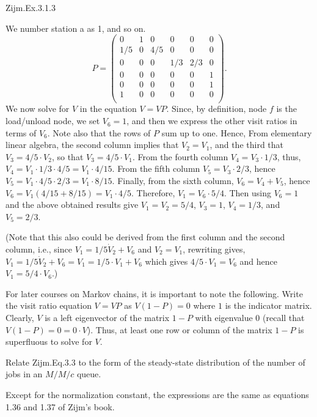 \begin{exercise}
Zijm.Ex.3.1.3
\begin{solution}
We number station a as 1, and so on.
\begin{equation*}
 P = 
 \begin{pmatrix}
 0 & 1 & 0 & 0 & 0 &0 \\
 1/5 & 0 & 4/5 & 0 & 0 & 0\\
 0& 0 & 0 & 1/3 & 2/3 & 0 \\
 0 & 0 & 0 & 0 & 0 & 1\\
 0 & 0 & 0 & 0 & 0 & 1\\
 1 & 0 & 0 & 0 & 0 & 0\\
 \end{pmatrix}.
\end{equation*}
We now solve for $V$ in the equation $V = VP$.
Since, by definition, node $f$ is the load/unload node, we set $V_6=1$, and then we express the other visit ratios in terms of $V_6$.
Note also that the rows of $P$ sum up to one.
Hence, From elementary linear algebra, the second column implies that $V_2 = V_1$, and the third that $V_3 = 4/5 \cdot V_2$, so that $V_3 = 4/5 \cdot V_1$.
From the fourth column $V_4 = V_3 \cdot 1/3 $, thus, $V_4 = V_1 \cdot 1/3 \cdot 4/5 = V_1 \cdot 4/15$.
From the fifth column $V_5 = V_3 \cdot 2/3$, hence $V_5 = V_1 \cdot 4/5 \cdot 2/3 = V_1 \cdot 8/15$.
Finally, from the sixth column, $V_6 = V_4+V_5$, hence $V_6 = V_1 (4/15 + 8/15)=V_1 \cdot 4/5$.
Therefore, $V_1 = V_6 \cdot 5/4$.
Then using $V_6 = 1$ and the above obtained results give $V_1 = V_2 = 5/4$, $V_3 = 1$, $V_4 = 1/3$, and $V_5 = 2/3$.

(Note that this also could be derived from the first column and the second column, i.e., since $V_1 = 1/5 \dot V_2 + V_6$ and $V_2 = V_1$, rewriting gives, $V_1 = 1/5 \dot V_2 + V_6 = V_1 = 1/5 \cdot V_1 + V_6$ which gives $4/5 \cdot V_1 = V_6$ and hence $V_1 = 5/4 \cdot V_6$.)

For later courses on Markov chains, it is important to note the following.
Write the visit ratio equation $V = VP$ as $V(1-P)=0$ where $1$ is the indicator matrix.
Clearly, $V$ is a left eigenvector of the matrix $1-P$ with eigenvalue 0 (recall that $V(1-P) = 0 = 0\cdot V$).
Thus, at least one row or column of the matrix $1-P$ is superfluous to solve for $V$.
\end{solution}
\end{exercise}

\begin{exercise}
 Relate Zijm.Eq.3.3 to the form of the steady-state distribution of
 the number of jobs in an $M/M/c$ queue.
\begin{solution}
 Except for the normalization constant, the expressions are the
 same as equations 1.36 and 1.37 of Zijm's book.
\end{solution}
\end{exercise}

